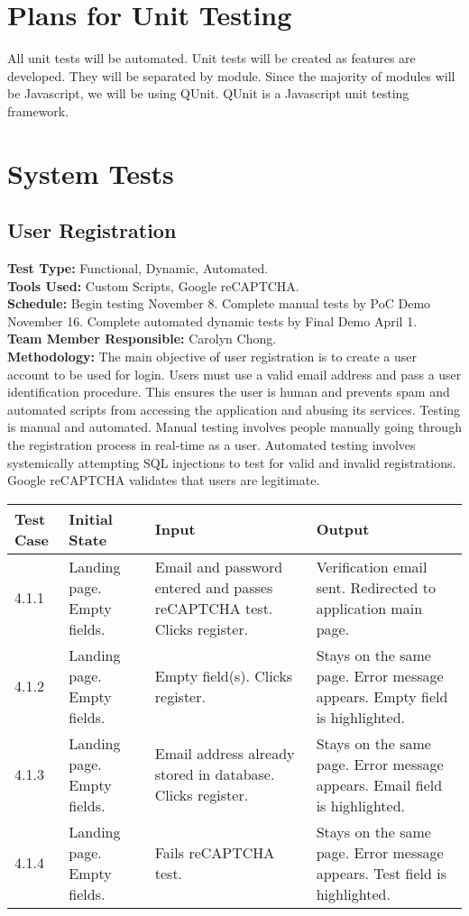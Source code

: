 \documentclass[12pt]{article}
\begin{document}
\section{Plans for Unit Testing}
All unit tests will be automated. Unit tests will be created as features are developed. They will be separated by module. Since the majority of modules will be Javascript, we will be using QUnit. QUnit is a Javascript unit testing framework. 


\section{System Tests}

\subsection{User Registration} 
\textbf{Test Type:} Functional, Dynamic, Automated. \\
\textbf{Tools Used:} Custom Scripts, Google reCAPTCHA. \\
\textbf{Schedule:} Begin testing November 8. Complete manual tests by PoC Demo November 16. Complete automated dynamic tests by Final Demo April 1. \\
\textbf{Team Member Responsible:} Carolyn Chong.\\
\textbf{Methodology:} The main objective of user registration is to create a user account to be used for login. Users must use a valid email address and pass a user identification procedure. This ensures the user is human and prevents spam and automated scripts from accessing the application and abusing its services. Testing is manual and automated. Manual testing involves people manually going through the registration process in real-time as a user. Automated testing involves systemically attempting SQL injections to test for valid and invalid registrations. Google reCAPTCHA validates that users are legitimate.

\begin{longtable}{|p{2cm}|p{3cm}|p{5cm}|p{5cm}|}
\hline
\textbf{Test Case}  & \textbf{Initial State} & \textbf{Input} & \textbf{Output} \\ \hline
4.1.1 & Landing page. Empty fields. & Email and password entered and passes reCAPTCHA test. Clicks register. & Verification email sent. Redirected to application main page. \\ 
\hline
4.1.2 & Landing page. Empty fields. & Empty field(s). Clicks register. & Stays on the same page. Error message appears. Empty field is highlighted. \\
\hline
4.1.3 & Landing page. Empty fields. & Email address already stored in database. Clicks register. & Stays on the same page. Error message appears. Email field is highlighted. \\
\hline
4.1.4 & Landing page. Empty fields. & Fails reCAPTCHA test. & Stays on the same page. Error message appears. Test field is highlighted. \\
\hline
\end{longtable}
\end{document}
